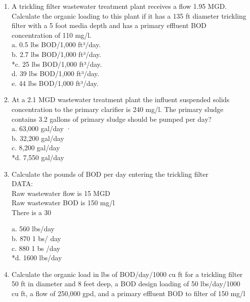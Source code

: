 \begin{enumerate}
\item  A trickling filter wastewater treatment plant receives a flow 1.95 MGD. Calculate the organic loading to this plant if it has a 135 ft diameter trickling filter with a 5 foot media depth and has a primary effluent BOD concentration of 110 mg/l. \\

 a. 0.5 lbs BOD/1,000 ft³/day. \\
 b. 2.7 lbs BOD/1,000 ft³/day. \\
 *c. 25 lbs BOD/1,000 ft³/day. \\
 d. 39 lbs BOD/1,000 ft³/day. \\
 e. 44 lbs BOD/1,000 ft³/day. \\


\item  At a 2.1 MGD wastewater treatment plant the influent suspended solids concentration to the primary clarifier is 240 mg/l.  The primary sludge contains 3.2%
 gallons of primary sludge should be pumped per day? \\

 a. 63,000 gal/day · \\
 b. 32,200 gal/day \\
 c. 8,200 gal/day \\
 *d. 7,550 gal/day \\


\item  Calculate the pounds of BOD per day entering the trickling filter\\
 DATA:\\
 Raw wastewater flow is 15 MGD\\
 Raw wastewater BOD is 150 mg/l\\
 There is a 30%

 a. 560 lbs/day \\
 b. 870 1 bs/ day \\
 c. 880 1 bs /day \\
 *d. 1600 lbs/day \\


\item  Calculate the organic load in lbs of BOD/day/1000 cu ft for a trickling filter 50 ft in diameter and 8 feet deep, a BOD design loading of 50 lbs/day/1000 cu ft, a flow of 250,000 gpd, and a primary effluent BOD to filter of 150 mg/l \\


\end{enumerate}
